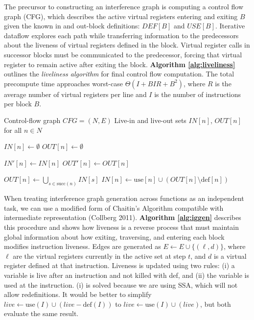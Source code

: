 \documentclass{article}
\begin{document}
The precursor to constructing an interference graph is computing a control flow graph (CFG), which describes the active virtual registers entering and exiting $B$ given the known in and out-block definitions: $\textit{DEF}[B]$ and $\textit{USE}[B]$. Iterative dataflow explores each path while transferring information to the predecessors about the liveness of virtual registers defined in the block. Virtual register calls in successor blocks must be communicated to the predecessor, forcing that virtual register to remain active after exiting the block. \textbf{Algorithm \ref{alg:liveliness}} outlines the \textit{liveliness algorithm} for final control flow computation. The total precompute time approaches worst-case $\Theta(I + BIR + B^2)$, where $R$ is the average number of virtual registers per line and $I$ is the number of instructions per block $B$. 

\begin{algorithm}[H]
\caption{Liveliness Algorithm}\label{alg:liveliness}
\begin{algorithmic}[1]
\Require Control-flow graph $CFG = (N, E)$
\Ensure Live-in and live-out sets $\textit{IN}[n]$, $\textit{OUT}[n]$ for all $n \in N$

    \State $\textit{IN}[n] \gets \emptyset$
    \State $\textit{OUT}[n] \gets \emptyset$
\EndFor

\Repeat
        \State $\textit{IN}'[n] \gets \textit{IN}[n]$
        \State $\textit{OUT}'[n] \gets \textit{OUT}[n]$
        
        \State $\textit{OUT}[n] \gets \!\!\bigcup_{s \in \mathrm{succ}(n)}\!\! \textit{IN}[s]$
        \State $\textit{IN}[n] \gets \mathrm{use}[n] \cup \left(\textit{OUT}[n] \setminus \mathrm{def}[n]\right)$
    \EndFor
{}

\end{algorithmic}
\end{algorithm}

When treating interference graph generation across functions as an independent task, we can use a modified form of Chaitin's Algorithm compatible with intermediate representation (Collberg 2011). \textbf{Algorithm \ref{alg:iggen}} describes this procedure and shows how liveness is a reverse process that must maintain global information about how exiting, traversing, and entering each block modifies instruction liveness. Edges are generated as $E \gets E \cup \{(\ell, d)\}$, where $\ell$ are the virtual registers currently in the active set at step $t$, and $d$ is a virtual register defined at that instruction. Liveness is updated using two rules: (i) a variable is live after an instruction and not killed with def, and (ii) the variable is used at the instruction. (i) is solved because we are using SSA, which will not allow redefinitions. It would be better to simplify $\textit{live} \gets \mathrm{use}(I) \cup (\textit{live} - \mathrm{def}(I))$ to $\textit{live} \gets \mathrm{use}(I) \cup (\textit{live})$, but both evaluate the same result. 
\end{document}
